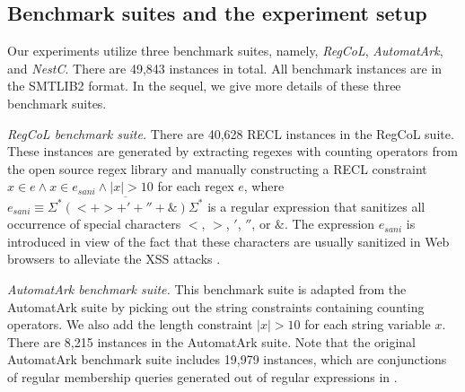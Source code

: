 \subsection{Benchmark suites and the experiment setup}\label{sec:bench}

Our experiments utilize three benchmark suites, namely, \emph{RegCoL}, \emph{AutomatArk}, and \emph{NestC}. 
There are 49,843 instances in total.
All benchmark instances are in the SMTLIB2 format. In the sequel, we give more details of these three benchmark suites.

\medskip
\noindent
\emph{RegCoL benchmark suite.} There are 40,628 RECL instances in the RegCoL suite. These instances are generated by extracting regexes with counting operators from the open source regex library \cite{regex_lingua_franca,redos_lenka} and manually constructing a RECL constraint $x \in e \wedge x \in e_{sani} \wedge |x| > 10$ for each regex $e$,
where $e_{sani} \equiv \overline{\Sigma^*(<+ >+'+''+\&)\Sigma^*}$ is a regular expression that sanitizes all occurrence of special characters $<$, $>$, $'$, $''$, or $\&$. 
The expression $e_{sani}$ is introduced in view of the fact that these characters are usually sanitized in Web browsers to alleviate the XSS attacks \cite{malware_detection_3_kudzu,CCH_18}.

\medskip
\noindent
\emph{AutomatArk benchmark suite.}
This benchmark suite is adapted from the AutomatArk suite \cite{z3str3re} by picking out the string constraints containing counting operators. We also add the length constraint $|x| > 10$ for each string variable $x$. There are 8,215 instances in the AutomatArk suite.
Note that the original AutomatArk benchmark suite \cite{z3str3re} includes 19,979 instances, which are conjunctions of regular membership queries generated out of regular expressions in \cite{automatark}.

